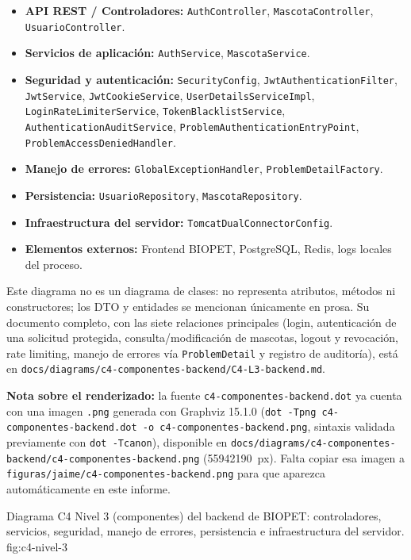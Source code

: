 \begin{itemize}[nosep]
  \item \textbf{API REST / Controladores:} \texttt{AuthController},
    \texttt{MascotaController}, \texttt{UsuarioController}.
  \item \textbf{Servicios de aplicaci\'on:} \texttt{AuthService},
    \texttt{MascotaService}.
  \item \textbf{Seguridad y autenticaci\'on:} \texttt{SecurityConfig},
    \texttt{JwtAuthenticationFilter}, \texttt{JwtService},
    \texttt{JwtCookieService}, \texttt{UserDetailsServiceImpl},
    \texttt{LoginRateLimiterService}, \texttt{TokenBlacklistService},
    \texttt{AuthenticationAuditService},
    \texttt{ProblemAuthenticationEntryPoint},
    \texttt{ProblemAccessDeniedHandler}.
  \item \textbf{Manejo de errores:} \texttt{GlobalExceptionHandler},
    \texttt{ProblemDetailFactory}.
  \item \textbf{Persistencia:} \texttt{UsuarioRepository},
    \texttt{MascotaRepository}.
  \item \textbf{Infraestructura del servidor:} \texttt{TomcatDualConnectorConfig}.
  \item \textbf{Elementos externos:} Frontend BIOPET, PostgreSQL, Redis,
    logs locales del proceso.
\end{itemize}

Este diagrama no es un diagrama de clases: no representa atributos,
m\'etodos ni constructores; los DTO y entidades se mencionan \'unicamente
en prosa. Su documento completo, con las siete relaciones principales
(login, autenticaci\'on de una solicitud protegida, consulta/modificaci\'on
de mascotas, logout y revocaci\'on, rate limiting, manejo de errores v\'ia
\texttt{ProblemDetail} y registro de auditor\'ia), est\'a en
\texttt{docs/diagrams/c4-componentes-backend/C4-L3-backend.md}.

\textbf{Nota sobre el renderizado:} la fuente \texttt{c4-componentes-backend.dot}
ya cuenta con una imagen \texttt{.png} generada con Graphviz 15.1.0
(\texttt{dot -Tpng c4-componentes-backend.dot -o c4-componentes-backend.png},
sintaxis validada previamente con \texttt{dot -Tcanon}), disponible en
\texttt{docs/diagrams/c4-componentes-backend/c4-componentes-backend.png}
(5594\texttimes{}2190~px). Falta copiar esa imagen a
\texttt{figuras/jaime/c4-componentes-backend.png} para que aparezca
autom\'aticamente en este informe.

%
{Diagrama C4 Nivel 3 (componentes) del backend de BIOPET: controladores, servicios, seguridad, manejo de errores, persistencia e infraestructura del servidor.}%
{fig:c4-nivel-3}

